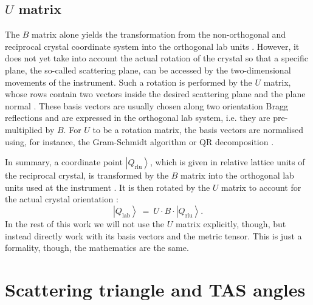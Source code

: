 \subsection{$U$ matrix}
The $B$ matrix alone yields the transformation from the non-orthogonal and reciprocal crystal 
coordinate system into the orthogonal lab units \cite{Lumsden2005}.
However, it does not yet take into account the actual rotation of the crystal so that a specific plane, 
the so-called scattering plane, can be accessed by the two-dimensional movements of the instrument. 
Such a rotation is performed by the $U$ matrix, whose rows contain two vectors inside the desired 
scattering plane and the plane normal \cite{Lumsden2005}.
These basis vectors are usually chosen along two orientation Bragg reflections \cite[pp. 87-88]{Shirane2002}
and are expressed in the orthogonal lab system, i.e. they are pre-multiplied by $B$.
For $U$ to be a rotation matrix, the basis vectors are normalised using, for instance, the
Gram-Schmidt algorithm \cite[p. 744]{Arens2015} \cite[pp. 269-270]{Arfken2013} or 
QR decomposition \cite[pp. 269-272]{Scarpino2011}.

In summary, a coordinate point $\left|Q_{\mathrm{rlu}}\right>$, which is given in relative lattice 
units of the reciprocal crystal, 
is transformed by the $B$ matrix into the orthogonal lab units used at the instrument \cite{Lumsden2005}.
It is then rotated by the $U$ matrix to account for the actual crystal orientation \cite{Lumsden2005}:
\begin{equation}
	\left|Q_{\mathrm{lab}}\right> \ =\  U \cdot B \cdot \left|Q_{\mathrm{rlu}}\right>.
	\label{eq:UBtrafo}
\end{equation}
In the rest of this work we will not use the $U$ matrix explicitly, though, but instead directly work 
with its basis vectors and the metric tensor. This is just a formality, though, the mathematics are the same.





\section{Scattering triangle and TAS angles \label{sec:tasangles}}

